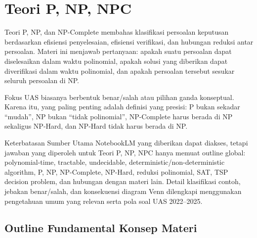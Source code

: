 \section{Teori P, NP, NPC}

Teori P, NP, dan NP-Complete membahas klasifikasi persoalan keputusan berdasarkan efisiensi penyelesaian, efisiensi verifikasi, dan hubungan reduksi antar persoalan. Materi ini menjawab pertanyaan: apakah suatu persoalan dapat diselesaikan dalam waktu polinomial, apakah solusi yang diberikan dapat diverifikasi dalam waktu polinomial, dan apakah persoalan tersebut sesukar seluruh persoalan di NP.

Fokus UAS biasanya berbentuk benar/salah atau pilihan ganda konseptual. Karena itu, yang paling penting adalah definisi yang presisi: P bukan sekadar ``mudah'', NP bukan ``tidak polinomial'', NP-Complete harus berada di NP sekaligus NP-Hard, dan NP-Hard tidak harus berada di NP.

\begin{cmt}{Keterbatasan Sumber Utama}{}
NotebookLM yang diberikan dapat diakses, tetapi jawaban yang diperoleh untuk Teori P, NP, NPC hanya memuat outline global: polynomial-time, tractable, undecidable, deterministic/non-deterministic algorithm, P, NP, NP-Complete, NP-Hard, reduksi polinomial, SAT, TSP decision problem, dan hubungan dengan materi lain. Detail klasifikasi contoh, jebakan benar/salah, dan konsekuensi diagram Venn dilengkapi menggunakan pengetahuan umum yang relevan serta pola soal UAS 2022--2025.
\end{cmt}

\subsection{Outline Fundamental Konsep Materi}

